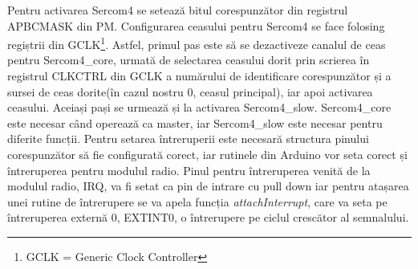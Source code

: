 \documentclass[12pt,a4paper]{report}
\begin{document}
Pentru activarea Sercom4 se setează bitul corespunzător din registrul APBCMASK din PM. Configurarea ceasului pentru Sercom4 se face folosing regiștrii din GCLK\footnote{GCLK = Generic Clock Controller}. Astfel, primul pas este să se dezactiveze canalul de ceas pentru Sercom4\_core, urmată de selectarea ceasului dorit prin scrierea în registrul CLKCTRL din GCLK a numărului de identificare corespunzător și a sursei de ceas dorite(în cazul nostru 0, ceasul principal), iar apoi activarea ceasului. Aceiași pași se urmează și la activarea Sercom4\_slow. Sercom4\_core este necesar când operează ca master, iar Sercom4\_slow este necesar pentru diferite funcții.
Pentru setarea întreruperii este necesară structura pinului corespunzător să fie configurată corect, iar rutinele din Arduino vor seta corect și întreruperea pentru modulul radio. Pinul pentru întreruperea venită de la modulul radio, IRQ, va fi setat ca pin de intrare cu pull down iar pentru atașarea unei rutine de întrerupere se va apela funcția \textit{attachInterrupt}, care va seta pe întreruperea externă 0, EXTINT0, o întrerupere pe ciclul crescător al semnalului.
\end{document}
